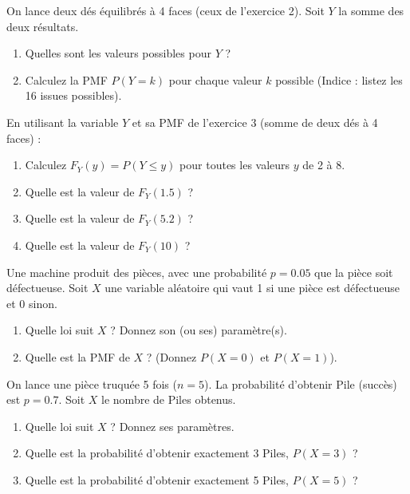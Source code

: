 \begin{exercicebox}
On lance deux dés équilibrés à 4 faces (ceux de l'exercice 2). Soit $Y$ la somme des deux résultats.
\begin{enumerate}
    \item Quelles sont les valeurs possibles pour $Y$ ?
    \item Calculez la PMF $P(Y=k)$ pour chaque valeur $k$ possible (Indice : listez les 16 issues possibles).
\end{enumerate}
\end{exercicebox}

\begin{exercicebox}
En utilisant la variable $Y$ et sa PMF de l'exercice 3 (somme de deux dés à 4 faces) :
\begin{enumerate}
    \item Calculez $F_Y(y) = P(Y \le y)$ pour toutes les valeurs $y$ de 2 à 8.
    \item Quelle est la valeur de $F_Y(1.5)$ ?
    \item Quelle est la valeur de $F_Y(5.2)$ ?
    \item Quelle est la valeur de $F_Y(10)$ ?
\end{enumerate}
\end{exercicebox}


\begin{exercicebox}
Une machine produit des pièces, avec une probabilité $p=0.05$ que la pièce soit défectueuse. Soit $X$ une variable aléatoire qui vaut 1 si une pièce est défectueuse et 0 sinon.
\begin{enumerate}
    \item Quelle loi suit $X$ ? Donnez son (ou ses) paramètre(s).
    \item Quelle est la PMF de $X$ ? (Donnez $P(X=0)$ et $P(X=1)$).
\end{enumerate}
\end{exercicebox}

\begin{exercicebox}
On lance une pièce truquée 5 fois ($n=5$). La probabilité d'obtenir Pile (succès) est $p=0.7$. Soit $X$ le nombre de Piles obtenus.
\begin{enumerate}
    \item Quelle loi suit $X$ ? Donnez ses paramètres.
    \item Quelle est la probabilité d'obtenir exactement 3 Piles, $P(X=3)$ ?
    \item Quelle est la probabilité d'obtenir exactement 5 Piles, $P(X=5)$ ?
\end{enumerate}
\end{exercicebox}

